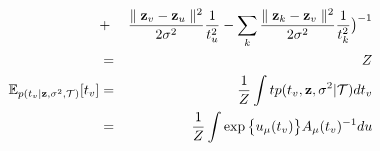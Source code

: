 \documentclass{article}
\begin{document}
\begin{eqnarray}
	 &+& \frac{\parallel \bold{z}_v - \bold{z}_u\parallel^2}{2\sigma^2}\frac{1}{t_u^2} - \sum_k \frac{\parallel \bold{z}_k - \bold{z}_v\parallel^2}{2\sigma^2}\frac{1}{t_k^2} \big)^{-1} \nonumber \\
	 &=& Z \\
	\mathbb{E}_{p(t_v | \bold{z}, \sigma^2, \mathcal{T})}[t_v] &=& \frac{1}{Z} \int tp(t_v, \bold{z}, \sigma^2 | \mathcal{T}) dt_v \nonumber \\
	&=& \frac{1}{Z} \int \exp \big\{ u_\mu(t_v)\big\}A_\mu(t_v)^{-1}du
	\end{eqnarray}
	
\end{document}

